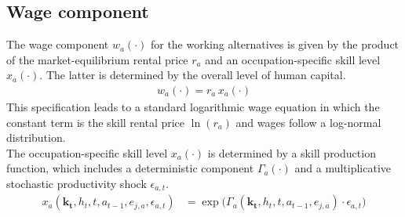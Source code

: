 \subsection{Wage component}
The wage component $w_{a}(\cdot)$ for the working alternatives is given by the product of the market-equilibrium rental price $r_{a}$ and an occupation-specific skill level $x_{a}(\cdot)$. The latter is determined by the overall level of human capital.
%
\begin{align*}
w_{a}(\cdot) = r_{a} \, x_{a}(\cdot)
\end{align*}
%
This specification leads to a standard logarithmic wage equation in which the constant term is the skill rental price $\ln(r_{a})$ and wages follow a log-normal distribution.\\

\noindent The occupation-specific skill level $x_{a}(\cdot)$ is determined by a skill production function, which includes a deterministic component $\Gamma_a(\cdot)$ and a multiplicative stochastic productivity shock $\epsilon_{a,t}$.
%
\begin{align}
    x_{a}(\bm{k_t}, h_t, t, a_{t-1}, e_{j, a}, \epsilon_{a,t}) & = \exp \big( \Gamma_{a}(\bm{k_t},  h_t, t, a_{t-1}, e_{j,a}) \cdot \epsilon_{a,t} \big) \nonumber
\end{align}
